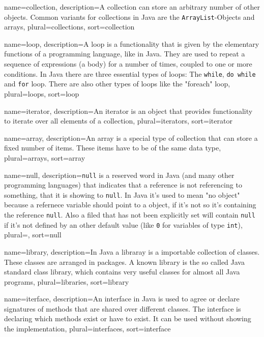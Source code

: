 {
	name=collection,
	description={A collection can store an arbitrary number of other 
		objects. Common variants for collections in Java are the
		\lstinline?ArrayList?-Objects and arrays},
	plural=collections,
	sort=collection
}

{
	name=loop,
	description={A loop is a functionality that is given by the 
		elementary functions of a programming language, like in Java.
		They are used to repeat a sequence of expressions (a body)
		for a number of times, coupled to one or more conditions.
		In Java there are three essential types of loops: 
		The \lstinline?while?, \lstinline?do while? and
		\lstinline?for? loop. There are also other types of loops
		like the "foreach" loop},
	plural=loops,
	sort=loop
}

{
	name=iterator,
	description={An iterator is an object that provides functionality to
		iterate over all elements of a collection},
	plural=iterators,
	sort=iterator
}

{
	name=array,
	description={An array is a special type of collection that can store
		a fixed number of items. These items have to be of the same 
		data type},
	plural=arrays,
	sort=array
}

{
	name=null,
	description={\lstinline?null? is a reserved word in Java (and many
		other programming languages) that indicates that a reference
		is not referencing to something, that it is showing to 
		\lstinline?null?. In Java it's used to mean "no object" 
		because a refernece variable should point to a object, if it's
		not so it's containing the reference \lstinline?null?. Also
		a filed that has not been explicitly set will contain 
		\lstinline?null? if it's not defined by an other default value
		(like \lstinline?0? for variables of type  \lstinline?int?)},
	plural=,
	sort=null
}

{
	name=library,
	description={In Java a libraray is a importable collection of classes.
		These classes are arranged in packages. A known library is 
		the so called Java standard class library, which contains
		very useful classes for almost all Java programs},
	plural=libraries,
	sort=library
}

{
	name=iterface,
	description={An interface in Java is used to agree
		or declare signatures of methods that are shared over 
		different classes. The interface is declaring which
		methods exist or have to exist. It can be used without
		showing the implementation},
	plural=interfaces,
	sort=interface
}

